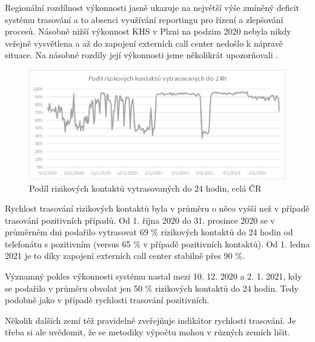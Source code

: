 Regionální rozdílnost výkonnosti jasně ukazuje na největší výše zmíněný deficit systému trasování a to absenci využívání reportingu pro řízení a zlepšování procesů. Násobně nižší výkonnost KHS v Plzni na podzim 2020 nebyla nikdy veřejně vysvětlena a až do zapojení externích call center nedošlo k nápravě situace. Na násobné rozdíly její výkonnosti jsme několikrát upozorňovali \cite{tr_bisop03}.

\begin{figure}[ht]
    \centering
    \includegraphics[width=1\textwidth]{./pic/d.eps}
    \caption{Podíl rizikových kontaktů vytrasovaných do 24 hodin, celá ČR}
    \label{fig:rizikove24}
\end{figure}

Rychlost trasování rizikových kontaktů byla v průměru o něco vyšší než v případě trasování pozitivních případů. Od 1. října 2020 do 31. prosince 2020 se v průměrném dni podařilo vytrasovat 69 \% rizikových kontaktů do 24 hodin od telefonátu s pozitivním (versus 65 \% v případě pozitivních kontaktů). Od 1. ledna 2021 je to díky zapojení externích call center stabilně přes 90 \%.

Významný pokles výkonnosti systému nastal mezi 10. 12. 2020 a 2. 1. 2021, kdy se podařilo v průměru obvolat jen 50 \% rizikových kontaktů do 24 hodin. Tedy podobně jako v případě rychlosti trasování pozitivních.

Několik dalších zemí též pravidelně zveřejňuje indikátor rychlosti trasování. Je třeba si ale uvědomit, že se metodiky výpočtu mohou v různých zemích lišit.

